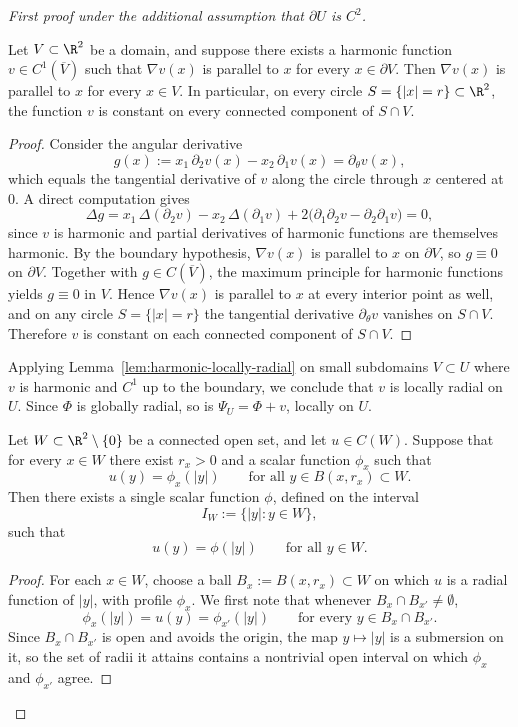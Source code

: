 \begin{proof}[First proof under the additional assumption that $\partial U$ is $C^2$]
\begin{lemma}\label{lem:harmonic-locally-radial}
Let $V\subset \R^2$ be a domain, and suppose there exists a harmonic
function $v\in C^1(\overline{V})$ such that $\nabla v(x)$ is parallel to
$x$ for every $x\in \partial V$. Then $\nabla v(x)$ is parallel to $x$
for every $x\in V$. In particular, on every circle
$S=\{|x|=r\}\subset \R^2$, the function $v$ is constant on every
connected component of $S\cap V$.
\end{lemma}

\begin{proof}
Consider the angular derivative
\[
g(x):=x_1\,\partial_2 v(x)-x_2\,\partial_1 v(x)
=\partial_\theta v(x),
\]
which equals the tangential derivative of $v$ along the circle
through $x$ centered at $0$. A direct computation gives
\[
\Delta g
=x_1\,\Delta(\partial_2 v)-x_2\,\Delta(\partial_1 v)
+2\big(\partial_1\partial_2 v-\partial_2\partial_1 v\big)
=0,
\]
since $v$ is harmonic and partial derivatives of harmonic functions
are themselves harmonic. By the boundary hypothesis, $\nabla v(x)$ is
parallel to $x$ on $\partial V$, so $g\equiv 0$ on $\partial V$.
Together with $g\in C(\overline{V})$, the maximum principle for
harmonic functions yields $g\equiv 0$ in $V$. Hence $\nabla v(x)$ is
parallel to $x$ at every interior point as well, and on any circle
$S=\{|x|=r\}$ the tangential derivative $\partial_\theta v$ vanishes
on $S\cap V$. Therefore $v$ is constant on each connected component
of $S\cap V$.
\end{proof}

Applying Lemma~\ref{lem:harmonic-locally-radial} on small subdomains
$V\subset U$ where $v$ is harmonic and $C^1$ up to the boundary, we
conclude that $v$ is locally radial on $U$. Since $\Phi$ is globally
radial, so is $\Psi_U=\Phi+v$, locally on $U$.

\begin{lemma}\label{lem:local-to-global-radial}
Let \(W\subset \R^2\setminus\{0\}\) be a connected open set, and let
\(u\in C(W)\). Suppose that for every \(x\in W\) there exist \(r_x>0\)
and a scalar function \(\phi_x\) such that
\[
u(y)=\phi_x(|y|)
\qquad\text{for all } y\in B(x,r_x)\subset W.
\]
Then there exists a single scalar function \(\phi\), defined on the
interval
\[
I_W:=\{|y|:y\in W\},
\]
such that
\[
u(y)=\phi(|y|)
\qquad\text{for all } y\in W.
\]
\end{lemma}

\begin{proof}
For each \(x\in W\), choose a ball \(B_x:=B(x,r_x)\subset W\) on which
\(u\) is a radial function of \(|y|\), with profile $\phi_x$. We
first note that whenever $B_x\cap B_{x'}\ne\emptyset$,
\[
\phi_x(|y|)=u(y)=\phi_{x'}(|y|)
\qquad\text{for every }y\in B_x\cap B_{x'}.
\]
Since $B_x\cap B_{x'}$ is open and avoids the origin, the map $y\mapsto
|y|$ is a submersion on it, so the set of radii it attains contains a
nontrivial open interval on which $\phi_x$ and $\phi_{x'}$ agree.


\end{proof}
\end{proof}
